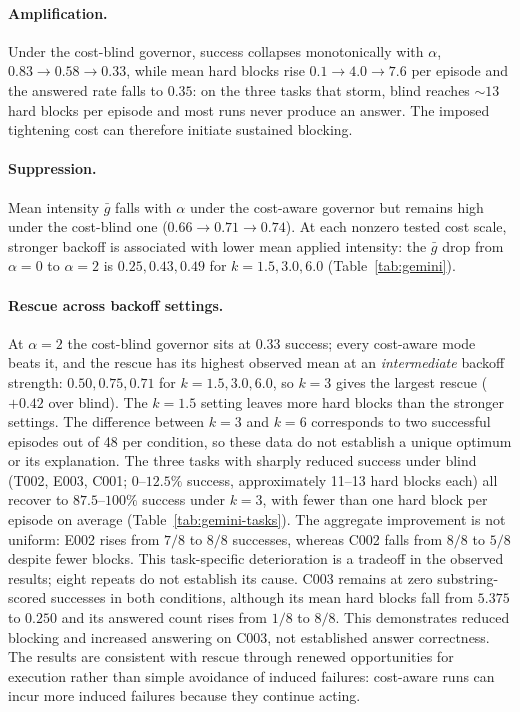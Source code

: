 \documentclass[11pt]{article}
\begin{document}
\paragraph{Amplification.} Under the cost-blind governor, success collapses
monotonically with $\alpha$, $0.83\to0.58\to0.33$, while mean hard blocks rise
$0.1\to4.0\to7.6$ per episode and the answered rate falls to $0.35$: on the
three tasks that storm, blind reaches ${\sim}13$ hard blocks per episode and
most runs never produce an answer. The imposed tightening cost can therefore initiate sustained blocking.

\paragraph{Suppression.} Mean intensity $\bar g$ falls with $\alpha$ under the
cost-aware governor but remains high under the cost-blind one
($0.66\to0.71\to0.74$). At each nonzero tested cost scale, stronger backoff
is associated with lower mean applied intensity: the $\bar g$ drop from
$\alpha{=}0$ to $\alpha{=}2$ is $0.25,0.43,0.49$ for $k=1.5,3.0,6.0$
(Table~\ref{tab:gemini}).

\paragraph{Rescue across backoff settings.} At $\alpha=2$ the cost-blind
governor sits at $0.33$ success; every cost-aware mode beats it, and the rescue
has its highest observed mean at an \emph{intermediate} backoff strength: $0.50,0.75,0.71$ for
$k=1.5,3.0,6.0$, so $k{=}3$ gives the largest rescue ($+0.42$ over blind). The $k{=}1.5$ setting leaves more hard blocks than the stronger settings.
The difference between $k{=}3$ and $k{=}6$ corresponds to two successful
episodes out of 48 per condition, so these data do not establish a unique
optimum or its explanation. The three tasks with sharply reduced success
under blind (T002, E003, C001; $0$--$12.5\%$ success, approximately 11--13 hard
blocks each) all recover to $87.5$--$100\%$ success under $k{=}3$, with fewer
than one hard block per episode on average
(Table~\ref{tab:gemini-tasks}). The aggregate improvement is not uniform:
E002 rises from $7/8$ to $8/8$ successes, whereas C002 falls from $8/8$ to
$5/8$ despite fewer blocks. This task-specific deterioration is a tradeoff in
the observed results; eight repeats do not establish its cause. C003 remains
at zero substring-scored successes in both conditions, although its mean hard
blocks fall from $5.375$ to $0.250$ and its answered count rises from $1/8$ to
$8/8$. This demonstrates reduced blocking and increased answering on C003,
not established answer correctness. The results are
consistent with rescue through renewed opportunities for execution rather
than simple avoidance of induced failures: cost-aware runs can incur more
induced failures because they continue acting.
\end{document}
